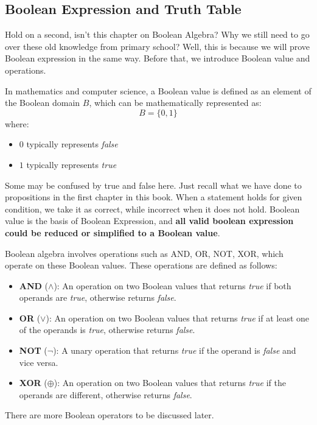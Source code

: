     \subsection{Boolean Expression and Truth Table}
        Hold on a second, isn't this chapter on Boolean Algebra? Why we still need to go over these
        old knowledge from primary school? Well, this is because we will prove Boolean expression in the
        same way. Before that, we introduce Boolean value and operations. 
        \begin{definition}
        In mathematics and computer science, a Boolean value is defined as an element of the Boolean domain \(B\), which can be mathematically represented as:
        \[
        B = \{0, 1\}
        \]
        where:
        \begin{itemize}
            \item \(0\) typically represents \textit{false}
            \item \(1\) typically represents \textit{true}
        \end{itemize}
        \end{definition}
        Some may be confused by true and false here. Just recall what we have done to propositions in
        the first chapter in this book. When a statement holds for given condition, we take it as
        correct, while incorrect when it does not hold. Boolean value is the basis of Boolean Expression,
        and \textbf{all valid boolean expression could be reduced or simplified to a Boolean value}.
        \begin{definition}
        Boolean algebra involves operations such as AND, OR, NOT, XOR, which operate on these Boolean values. These operations are defined as follows:
        \begin{itemize}
            \item \textbf{AND} (\(\land\)): An operation on two Boolean values that returns \textit{true} if both operands are \textit{true}, otherwise returns \textit{false}.
            \item \textbf{OR} (\(\lor\)): An operation on two Boolean values that returns \textit{true} if at least one of the operands is \textit{true}, otherwise returns \textit{false}.
            \item \textbf{NOT} (\(\lnot\)): A unary operation that returns \textit{true} if the operand is \textit{false} and vice versa.
            \item \textbf{XOR} (\(\oplus\)): An operation on two Boolean values that returns \textit{true} if the operands are different, otherwise returns \textit{false}.
        \end{itemize}
        \begin{remark}
            There are more Boolean operators to be discussed later.
        \end{remark}
        \end{definition}

